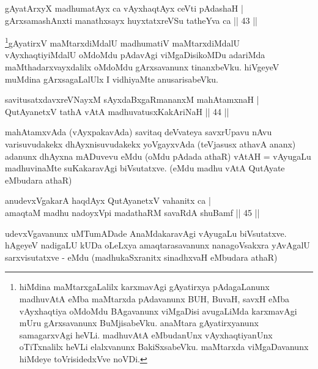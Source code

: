 
\begin{shl}
gAyatArxyX madhumatAyx ca vAyxhaqtAyx ceVti pAdashaH | \\
gArxsamashAnxti manathxsayx huyxtatxreVSu tatheYva ca \hfill|| 43 || 
\end{shl}

\begin{artha}
\footnote{hiMdina maMtarxgaLalilx karxmavAgi gAyatirxya 
pAdagaLanunx madhuvAtA eMba maMtarxda pAdavanunx BUH, BuvaH, savxH 
eMba vAyxhaqtiya oMdoMdu BAgavanunx viMgaDisi avugaLiMda karxmavAgi 
mUru gArxsavanunx BuMjisabeVku. anaMtara gAyatirxyanunx samagarxvAgi 
heVLi. madhuvAtA eMbudanUnx vAyxhaqtiyanUnx oTiTxnalilx heVLi 
elalxvanunx BakiSxsabeVku. maMtarxda viMgaDavanunx hiMdeye 
toVrisidedxVve noVDi.}gAyatirxV maMtarxdiMdalU madhumatiV maMtarxdiMdalU 
vAyxhaqtiyiMdalU oMdoMdu pAdavAgi viMgaDisikoMDu adariMda 
maMthadarxvayxdalilx oMdoMdu gArxsavanunx tinanxbeVku. hiVgeyeV muMdina 
gArxsagaLalUlx I vidhiyaMte anusarisabeVku.
\end{artha}


\begin{shl}
savitusatxdavxreVNayxM sAyxdaBxgaRmananxM mahAtamxnaH | \\
QutAyanetxV tathA vAtA madhuvatusxKakAriNaH \hfill|| 44 || 
\end{shl}

\begin{artha}
mahAtamxvAda (vAyxpakavAda) savitaq deVvateya savxrUpavu nAvu 
varisuvudakekx dhAyxnisuvudakekx yoVgayxvAda (teVjasusx athavA ananx) 
adanunx dhAyxna mADuvevu eMdu (oMdu pAdada athaR) vAtAH = vAyugaLu 
madhuvinaMte suKakaravAgi biVsutatxve. (eMdu madhu vAtA QutAyate 
eMbudara athaR)
\end{artha}


\begin{shl}
anudevxVgakarA haqdAyx QutAyanetxV vahanitx ca | \\
amaqtaM madhu nadoyxV\s pi madathaRM savaRdA shuBamf \hfill|| 45 || 
\end{shl}

\begin{artha}
udevxVgavanunx uMTumADade AnaMdakaravAgi vAyugaLu biVsutatxve. hAgeyeV 
nadigaLU kUDa oLeLxya amaqtarasavanunx nanagoVsakxra yAvAgalU 
sarxvisutatxve - eMdu (madhukaSxranitx sinadhxvaH eMbudara athaR)
\end{artha}


